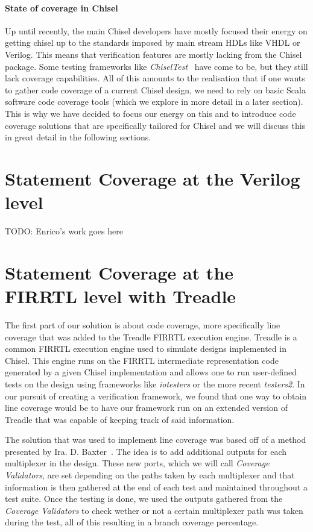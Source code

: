 \documentclass[conference]{IEEEtran}
\newcommand{\todo}[1]{{\color{olive} TODO: #1}}
\begin{document}
\paragraph{State of coverage in Chisel} Up until recently, the main Chisel developers have mostly focused their energy on getting chisel up to the standards imposed by main stream HDLs like VHDL or Verilog. This means that verification features are mostly lacking from the Chisel package. Some testing frameworks like \textit{ChiselTest}~\cite{chisel:tester2} have come to be, but they still lack coverage capabilities. All of this amounts to the realisation that if one wants to gather code coverage of a current Chisel design, we need to rely on basic Scala software code coverage tools (which we explore in more detail in a later section). This is why we have decided to focus our energy on this and to introduce code coverage solutions that are specifically tailored for Chisel and we will discuss this in great detail in the following sections.

\section{Statement Coverage at the Verilog level}
\todo{Enrico's work goes here}

\section{Statement Coverage at the FIRRTL level with Treadle}  
The first part of our solution is about code coverage, more specifically line coverage that was added to the Treadle FIRRTL execution engine. Treadle is a common FIRRTL execution engine used to simulate designs implemented in Chisel. This engine runs on the FIRRTL intermediate representation code generated by a given Chisel implementation and allows one to run user-defined tests on the design using frameworks like \textit{iotesters} or the more recent \textit{testers2}. In our pursuit of creating a verification framework, we found that one way to obtain line coverage would be to have our framework run on an extended version of Treadle that was capable of keeping track of said information.

The solution that was used to implement line coverage was based off of a method presented by Ira. D. Baxter~\cite{branch-cov-made-easy:2002}. The idea is to add additional outputs for each multiplexer in the design. These new ports, which we will call \textit{Coverage Validators}, are set depending on the paths taken by each multiplexer and that information is then gathered at the end of each test and maintained throughout a test suite. Once the testing is done, we used the outputs gathered from the \textit{Coverage Validators} to check wether or not a certain multiplexer path was taken during the test, all of this resulting in a branch coverage percentage. 
\end{document}
